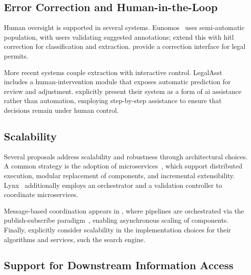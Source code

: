 \subsection{Error Correction and Human-in-the-Loop}

Human oversight is supported in several systems. Eunomos~\cite{boella2016eunomos} uses semi-automatic population, with users validating suggested annotations; \textcite{boella2019semi} extend this with \acf{hitl} correction for classification and extraction. \textcite{breit_legal_permits_2020} provide a correction interface for legal permits.

More recent systems couple extraction with interactive control. LegalAsst~\cite{HAN2024121052legalasst} includes a human-intervention module that exposes automatic prediction for review and adjustment. \textcite{human-ai-system-legal-precedent-search-china} explicitly present their system as a form of \ac{ai} assistance rather than automation, employing step-by-step assistance to ensure that decisions remain under human control.




\subsection{Scalability}

Several proposals address scalability and robustness through architectural choices. 
A common strategy is the adoption of microservices~\cite{P_rez_2021,buey2016,MorenoSchneider2021LynxCuration,RodriguezDoncel2019LynxDMP,bellandi2025streamlining,breit_legal_permits_2020}, which support distributed execution, modular replacement of components, and incremental extensibility. 
Lynx~\cite{MorenoSchneider2021LynxCuration,RodriguezDoncel2019LynxDMP} additionally employs an orchestrator and a validation controller to coordinate microservices.

Message-based coordination appears in \textcite{bellandi2025streamlining,P_rez_2021}, where pipelines are orchestrated via the publish-subscribe paradigm~\cite{pubsub_2003}, enabling asynchronous scaling of components.
Finally, \textcite{szekely2015building,kejriwal2017searchengine,kejriwal2018} explicitly consider scalability in the implementation choices for their algorithms and services, such the search engine.



\subsection{Support for Downstream Information Access}

